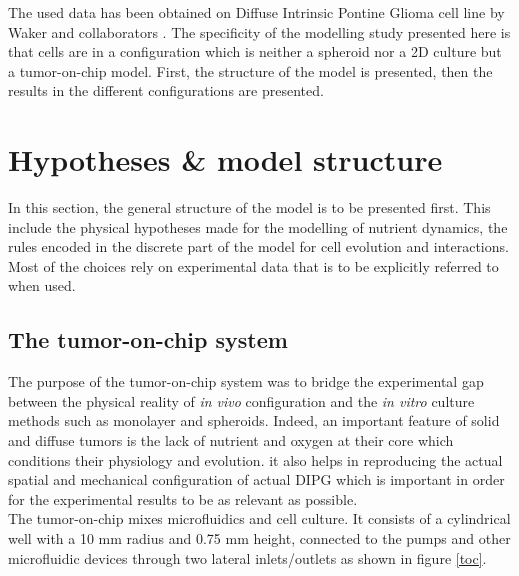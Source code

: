 \documentclass[11pt,a4paper]{article}
\begin{document}
The used data has been obtained on Diffuse Intrinsic Pontine Glioma cell line by Waker and collaborators \cite{Waker2018}. The specificity of the modelling study presented here is that cells are in a configuration which is neither a spheroid nor a 2D culture but a tumor-on-chip model. First, the structure of the model is presented, then the results in the different configurations are presented.\\ 

\section{Hypotheses \& model structure} 
In this section, the general structure of the model is to be presented first. This include the physical hypotheses made for the modelling of nutrient dynamics, the rules encoded in the discrete part of the model for cell evolution and interactions.  Most of the choices rely on experimental data that is to be explicitly referred to when used.

\subsection{The tumor-on-chip system}
The purpose of the tumor-on-chip system was to bridge the experimental gap between the physical reality of \textit{in vivo} configuration and the \textit{in vitro} culture methods such as monolayer and spheroids. Indeed, an important feature of solid and diffuse tumors is the lack of nutrient and oxygen at their core which conditions their physiology and evolution. it also helps in reproducing the actual spatial and mechanical configuration of actual DIPG which is important in order for the experimental results to be as relevant as possible.\\

The tumor-on-chip mixes microfluidics and cell culture. It consists of a cylindrical well with a 10 mm radius and 0.75 mm height, connected to the pumps and other microfluidic devices through two lateral inlets/outlets as shown in figure \ref{toc}. \\
\end{document}
